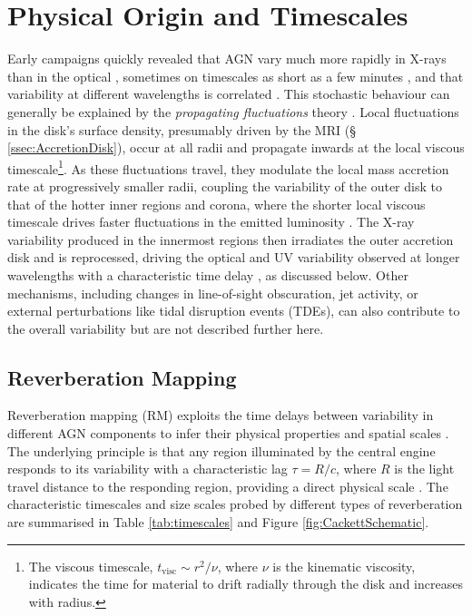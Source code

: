 \section{Physical Origin and Timescales}
\label{sec:PhysOrigin}

Early campaigns quickly revealed that AGN vary much more rapidly in X-rays than in the optical \parencite{WinklerWhite1975XRayVariab}, sometimes on timescales as short as a few minutes \parencite{McHardy1981minuteVar}, and that variability at different wavelengths is correlated \parencite{Ulrich1997VARIABILITY}. This stochastic behaviour can generally be explained by the \textit{propagating fluctuations} theory \parencite{Lyubarskii1997PropFluct}. Local fluctuations in the disk's surface density, presumably driven by the MRI (\S\,\ref{ssec:AccretionDisk}), occur at all radii and propagate inwards at the local viscous timescale\footnote{The viscous timescale, $t_\mathrm{visc} \sim r^2/\nu$, where $\nu$ is the kinematic viscosity, indicates the time for material to drift radially through the disk and increases with radius.}. As these fluctuations travel, they modulate the local mass accretion rate at progressively smaller radii, coupling the variability of the outer disk to that of the hotter inner regions and corona, where the shorter local viscous timescale drives faster fluctuations in the emitted luminosity \parencite{Uttley2023AccretionLags}. The X-ray variability produced in the innermost regions then irradiates the outer accretion disk and is reprocessed, driving the optical and UV variability observed at longer wavelengths with a characteristic time delay \parencite{Padovani2017whatisaname}, as discussed below.
Other mechanisms, including changes in line-of-sight obscuration, jet activity, or external perturbations like tidal disruption events (TDEs), can also contribute to the overall variability but are not described further here. 

\subsection{Reverberation Mapping}
\label{ssec:RebMap}
Reverberation mapping (RM) exploits the time delays between variability in different AGN components to infer their physical properties and spatial scales \parencite{Blandford1982RM}. The underlying principle is that any region illuminated by the central engine responds to its variability with a characteristic lag $\tau = R/c$, where $R$ is the light travel distance to the responding region, providing a direct physical scale \parencite{Peterson2006BLR}. The characteristic timescales and size scales probed by different types of reverberation are summarised in Table \ref{tab:timescales} and Figure \ref{fig:CackettSchematic}.

